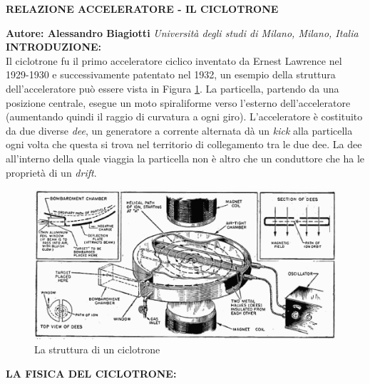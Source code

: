 \documentclass[a4paper,10pt]{article}
\begin{document}
\noindent
\begin{center}
	\textbf{{\Large RELAZIONE ACCELERATORE - IL CICLOTRONE}} \\
\end{center}

\noindent
\textbf{Autore: Alessandro Biagiotti} \hfill \textit{Università degli studi di Milano, Milano,
	Italia}
\\

\makeatletter\def\@currentlabel{\texttt{(I)}}\makeatother
\label{sec:intro}
\noindent
\textbf{INTRODUZIONE:}
\\
Il ciclotrone fu il primo acceleratore ciclico inventato da Ernest Lawrence nel 1929-1930 e
successivamente patentato nel 1932, un esempio della struttura dell'acceleratore può essere vista
in Figura \ref{fig:cyclotron}. La particella, partendo da una posizione centrale, esegue un
moto spiraliforme verso l'esterno dell'acceleratore (aumentando quindi il raggio di curvatura a ogni
giro). L'acceleratore è costituito da due diverse \emph{dee}, un generatore a corrente alternata dà
un \emph{kick} alla particella ogni volta che questa si trova nel territorio di collegamento tra le
due dee. La dee all'interno della quale viaggia la particella non è altro che un conduttore che ha
le proprietà di un \emph{drift}.

\begin{figure}[h!]
	\centering

	\includegraphics[scale=0.35]{fig/Cyclotron-diagram.png}
	\caption{
		La struttura di un ciclotrone
	}\label{fig:cyclotron}
\end{figure}

\bigskip
{}
\makeatletter\def\@currentlabel{\texttt{(II)}}\makeatother
\label{sec:cyclotron}
\noindent
\textbf{LA FISICA DEL CICLOTRONE:}

\clearpage

\printbibliography
\end{document}
